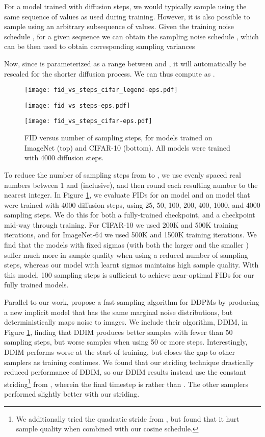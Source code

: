 \documentclass{article}
\begin{document}
For a model trained with  diffusion steps, we would typically sample using the same sequence of  values  as used during training. However, it is also possible to sample using an arbitrary subsequence  of  values. Given the training noise schedule , for a given sequence  we can obtain the sampling noise schedule , which can be then used to obtain corresponding sampling variances


Now, since  is parameterized as a range between  and , it will automatically be rescaled for the shorter diffusion process. We can thus compute  as . 


\begin{figure}[t]
\begin{center}
\centerline{\texttt{[image: fid\_vs\_steps\_cifar\_legend-eps.pdf]}}
\centerline{\texttt{[image: fid\_vs\_steps-eps.pdf]}}
\centerline{\texttt{[image: fid\_vs\_steps\_cifar-eps.pdf]}}
\caption{\label{fig:fidvssteps} FID versus number of sampling steps, for models trained on ImageNet  (top) and CIFAR-10 (bottom). All models were trained with 4000 diffusion steps.}
\end{center}
\vskip -0.4in
\end{figure}

To reduce the number of sampling steps from  to , we use  evenly spaced real numbers between 1 and  (inclusive), and then round each resulting number to the nearest integer. In Figure \ref{fig:fidvssteps}, we evaluate FIDs for an  model and an  model that were trained with 4000 diffusion steps, using 25, 50, 100, 200, 400, 1000, and 4000 sampling steps. We do this for both a fully-trained checkpoint, and a checkpoint mid-way through training. For CIFAR-10 we used 200K and 500K training iterations, and for ImageNet-64 we used 500K and 1500K training iterations.
We find that the  models with fixed sigmas (with both the larger  and the smaller ) suffer much more in sample quality when using a reduced number of sampling steps, whereas our  model with learnt sigmas maintains high sample quality. With this model, 100 sampling steps is sufficient to achieve near-optimal FIDs for our fully trained models. 

Parallel to our work, \citet{ddim} propose a fast sampling algorithm for DDPMs by producing a new implicit model that has the same marginal noise distributions, but deterministically maps noise to images. We include their algorithm, DDIM, in Figure \ref{fig:fidvssteps}, finding that DDIM produces better samples with fewer than 50 sampling steps, but worse samples when using 50 or more steps. Interestingly, DDIM performs worse at the start of training, but closes the gap to other samplers as training continues. We found that our striding technique drastically reduced performance of DDIM, so our DDIM results instead use the constant striding\footnote{We additionally tried the quadratic stride from \citet{ddim}, but found that it hurt sample quality when combined with our cosine schedule.} from \citet{ddim}, wherein the final timestep is  rather than . The other samplers performed slightly better with our striding.
\end{document}
